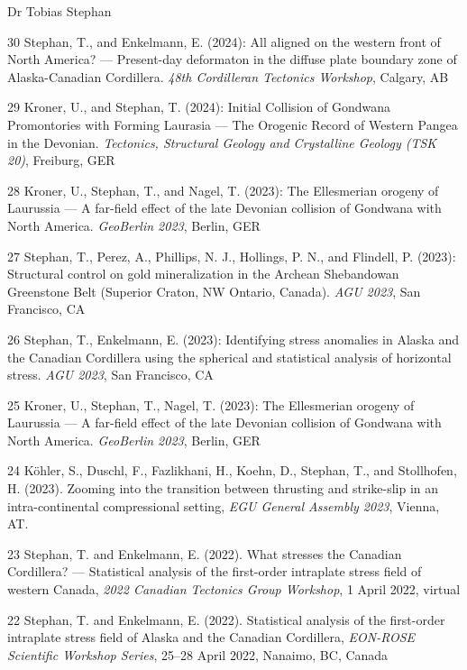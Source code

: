 \documentclass[10pt, paper=letter]{scrartcl} %
\begin{document}
\begin{cv}{\textsf{Dr Tobias Stephan}}
\begin{cvlist}{}
        \item[30] Stephan, T., and Enkelmann, E. (2024): All aligned on the western front of North America? --– Present-day deformaton in the diffuse plate boundary zone of Alaska-Canadian Cordillera. \textit{48th Cordilleran Tectonics Workshop}, Calgary, AB
        \item[29] Kroner, U., and Stephan, T. (2024): Initial Collision of Gondwana Promontories with Forming Laurasia --- The Orogenic Record of Western Pangea in the Devonian. \textit{Tectonics, Structural Geology and Crystalline Geology (TSK 20)}, Freiburg, GER
        \item[28] Kroner, U., Stephan, T., and Nagel, T. (2023): The Ellesmerian orogeny of Laurussia –-- A far-field effect of the late Devonian collision of Gondwana with North America. \textit{GeoBerlin 2023}, Berlin, GER
        \item[27] Stephan, T., Perez, A., Phillips, N. J., Hollings, P. N., and Flindell, P. (2023): Structural control on gold mineralization in the Archean Shebandowan Greenstone Belt (Superior Craton, NW Ontario, Canada). \textit{AGU 2023}, San Francisco, CA
        \item[26] Stephan, T., Enkelmann, E. (2023): Identifying stress anomalies in Alaska and the Canadian Cordillera using the spherical and statistical analysis of horizontal stress. \textit{AGU 2023}, San Francisco, CA
        \item[25] Kroner, U., Stephan, T., Nagel, T. (2023): The Ellesmerian orogeny of Laurussia –-- A far-field effect of the late Devonian collision of Gondwana with North America. \textit{GeoBerlin 2023}, Berlin, GER
        \item[24] K\"ohler, S., Duschl, F., Fazlikhani, H., Koehn, D., Stephan, T., and Stollhofen, H. (2023).  Zooming into the transition between thrusting and strike-slip in an intra-continental compressional setting, \textit{EGU General Assembly 2023}, Vienna, AT. 
        \item[23] Stephan, T. and Enkelmann, E. (2022). What stresses the Canadian Cordillera? --- Statistical analysis of the first-order intraplate stress field of western Canada, \textit{2022 Canadian Tectonics Group Workshop}, 1 April 2022, virtual
        \item[22] Stephan, T. and Enkelmann, E. (2022). Statistical analysis of the first-order intraplate stress field of Alaska and the Canadian Cordillera, \textit{EON-ROSE Scientific Workshop Series}, 25--28 April 2022, Nanaimo, BC, Canada

\end{cvlist}
\end{cv}
\end{document}
